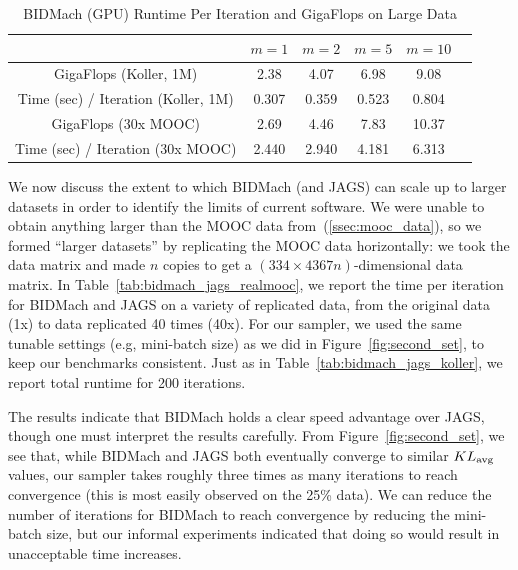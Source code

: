 \documentclass{article} %
\begin{document}
%
%
\begin{table}[t]
\small
\caption{BIDMach (GPU) Runtime Per Iteration and GigaFlops on Large Data}
\label{tab:tradeoff}
\begin{center}
\begin{tabular}{ |c|c|c|c|c|c| } 
\hline
               & $m=1$ & $m=2$ & $m=5$ & $m=10$ \\
\hline \hline
GigaFlops (Koller, 1M)               & 2.38  & 4.07  &  6.98  &  9.08  \\ 
Time (sec) / Iteration (Koller, 1M)  & 0.307 & 0.359 &  0.523 &  0.804 \\
\hline
GigaFlops (30x MOOC)              & 2.69  & 4.46  & 7.83  & 10.37   \\ 
Time (sec) / Iteration (30x MOOC) & 2.440 & 2.940 & 4.181 & 6.313   \\
\hline
\end{tabular}
\end{center}
\end{table}

We now discuss the extent to which BIDMach (and JAGS) can scale up to larger datasets in order to
identify the limits of current software. We were unable to obtain anything larger than the MOOC data
from~(\ref{ssec:mooc_data}), so we formed ``larger datasets'' by replicating the MOOC data
horizontally: we took the data matrix and made $n$ copies to get a $(334 \times 4367n)$-dimensional
data matrix. In Table~\ref{tab:bidmach_jags_realmooc}, we report the time per iteration for BIDMach
and JAGS on a variety of replicated data, from the original data (1x) to data replicated 40 times
(40x). For our sampler, we used the same tunable settings (e.g, mini-batch size) as we did in
Figure~\ref{fig:second_set}, to keep our benchmarks consistent. Just as in
Table~\ref{tab:bidmach_jags_koller}, we report total runtime for 200 iterations.

The results indicate that BIDMach holds a clear speed advantage over JAGS, though one must interpret
the results carefully. From Figure~\ref{fig:second_set}, we see that, while BIDMach and JAGS both
eventually converge to similar $KL_{\rm avg}$ values, our sampler takes roughly three times as many
iterations to reach convergence (this is most easily observed on the 25\% data). We can reduce the
number of iterations for BIDMach to reach convergence by reducing the mini-batch size, but our
informal experiments indicated that doing so would result in unacceptable time increases.
\end{document}
